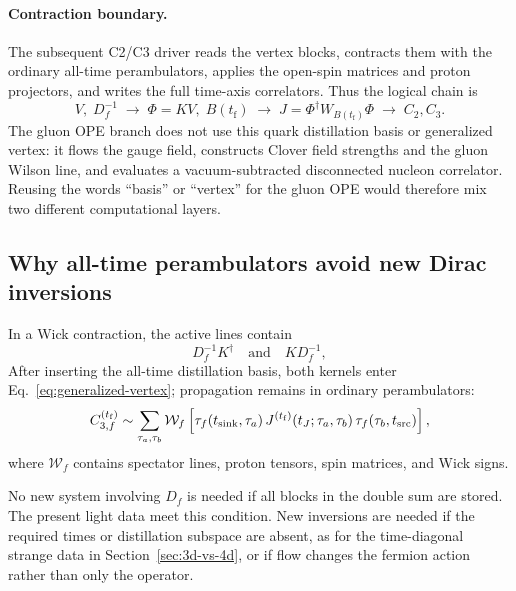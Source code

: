\documentclass[11pt]{article}
\numberwithin{equation}{section}
\newcommand{\tf}{t_{\mathrm f}}
\begin{document}
\paragraph{Contraction boundary.}
The subsequent C2/C3 driver reads the vertex blocks, contracts them with the
ordinary all-time perambulators, applies the open-spin matrices and proton
projectors, and writes the full time-axis correlators.  Thus the logical chain
is
\begin{equation}
  V,\;D_f^{-1}
  \;\longrightarrow\;
  \Phi=KV,\;B(\tf)
  \;\longrightarrow\;
  J=\Phi^\dagger W_{B(\tf)}\Phi
  \;\longrightarrow\;
  C_2,C_3.
  \label{eq:basis-vertex-c3-chain}
\end{equation}
The gluon OPE branch does not use this quark distillation basis or generalized
vertex: it flows the gauge field, constructs Clover field strengths and the
gluon Wilson line, and evaluates a vacuum-subtracted disconnected nucleon
correlator.  Reusing the words ``basis'' or ``vertex'' for the gluon OPE
would therefore mix two different computational layers.

\subsection{Why all-time perambulators avoid new Dirac inversions}

In a Wick contraction, the active lines contain
\begin{equation}
  D_f^{-1}K^\dagger
  \quad\text{and}\quad
  KD_f^{-1},
\end{equation}
After inserting the all-time distillation basis, both kernels enter
Eq.~\eqref{eq:generalized-vertex}; propagation remains in ordinary
perambulators:
\begin{equation}
  C_{3,f}^{(\tf)}
  \sim
  \sum_{\tau_a,\tau_b}
  \mathcal W_f
  \left[
    \tau_f(t_{\rm sink},\tau_a)\,
    J^{(\tf)}(t_J;\tau_a,\tau_b)\,
    \tau_f(\tau_b,t_{\rm src})
  \right],
  \label{eq:c3-perambulator-schematic}
\end{equation}
where \(\mathcal W_f\) contains spectator lines, proton tensors, spin matrices,
and Wick signs.

No new system involving \(D_f\) is needed if all blocks in the double sum are
stored. The present light data meet this condition. New inversions are needed
if the required times or distillation subspace are absent, as for the
time-diagonal strange data in Section~\ref{sec:3d-vs-4d}, or if flow changes
the fermion action rather than only the operator.
\end{document}
